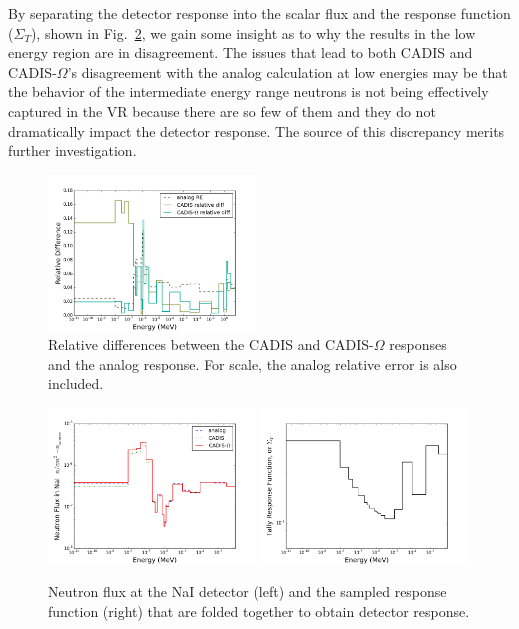 \documentclass[12pt]{article}
\begin{document}
By separating the detector response into the scalar flux and the response function ($\Sigma_{T}$), shown in Fig.~\ref{fig::tallyproducts}, we gain some insight as to why the results in the low energy region are in disagreement.
The issues that lead to both CADIS and CADIS-$\Omega$'s disagreement with the analog calculation at low energies may be that the behavior of the intermediate energy range neutrons is not being effectively captured in the VR because there are so few of them and they do not dramatically impact the detector response. 
The source of this discrepancy merits further investigation. 
\begin{figure}
  \begin{center}
    \includegraphics[width=0.49\textwidth]{./images/maze2_relative_diff_p3q10.png}
    \caption[]{\label{fig::rediffs} Relative differences between the CADIS and CADIS-$\Omega$ responses and the analog response. For scale, the analog relative error is also included. }
  \end{center}
\end{figure}
%
\begin{figure}
  \begin{center}
    \includegraphics[width=0.49\textwidth]{./images/flux.png}
    \includegraphics[width=0.49\textwidth]{./images/response_function.png}
    \caption[]{\label{fig::tallyproducts} Neutron flux at the NaI detector (left) and the sampled response function (right) that are folded together to obtain detector response. }
  \end{center}
\end{figure}
\end{document}
